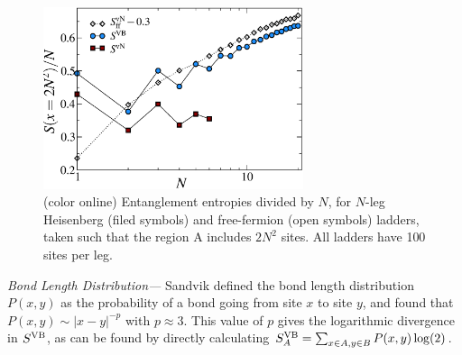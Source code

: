 \documentclass[prl,aps,twocolumn,floatfix,amsmath,amssymb,superscriptaddress,tightenlines]{revtex4}
\begin{document}

\begin{figure} { \includegraphics[width=3in]{fig4.eps} \caption{(color
online) Entanglement entropies divided by $N$,  for $N$-leg Heisenberg (filed symbols) and free-fermion (open symbols) ladders, taken such that the region A includes $2N^2$ sites.
All ladders
have 100 sites per leg.  \label{zigzag}}} \end{figure}

{\it Bond Length Distribution---} Sandvik defined the bond length
distribution $P(x,y)$ as the probability of a bond going from site $x$ to
site $y$, and found that $P(x,y)\sim |x-y|^{-p}$ with $p\approx 3$.  
This value of $p$ gives the logarithmic divergence in $S^{\rm VB}$, as can be
found by directly calculating $S^{\rm VB}_{A}=\sum_{x\in A,y\in B} P(x,y)
\log(2)$.
\end{document}
